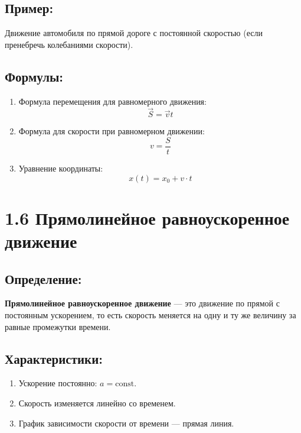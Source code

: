 \documentclass[a4paper,12pt]{article}
\begin{document}
\subsection*{Пример:}
\vspace{-3pt}
Движение автомобиля по прямой дороге с постоянной скоростью (если пренебречь колебаниями скорости).
\vspace{-9pt}
\subsection*{Формулы:}
\vspace{-3pt}
\begin{enumerate}
  \item Формула перемещения для равномерного движения:
    \vspace{-0.05em}
    $$ \vec{S} = \vec{v}t $$ 
  \item Формула для скорости при равномерном движении:
    \vspace{-0.05em}
    $$ v = \frac{S}{t} $$ 
  \item Уравнение координаты:
    \vspace{-0.05em}
    $$ x(t) = x_0 + v \cdot t $$ 
\end{enumerate}


\section*{1.6 Прямолинейное равноускоренное движение}

\vspace{-9pt}
\subsection*{Определение:}
\vspace{-3pt}
\textbf{Прямолинейное равноускоренное движение} — это движение по прямой с постоянным ускорением, то есть скорость меняется на одну и ту же величину за равные промежутки времени.
\vspace{-9pt}
\subsection*{Характеристики:}
\vspace{-3pt}
\begin{enumerate}[itemsep=0pt, topsep=0pt, parsep=3pt]
  \item Ускорение постоянно: $a = \text{const}$.
  \item Скорость изменяется линейно со временем.
  \item График зависимости скорости от времени — прямая линия.
\end{enumerate}
\vspace{-9pt}
\end{document}

